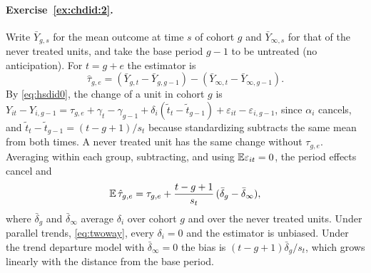 \paragraph{Exercise~\ref{ex:chdid:2}.} Write $\bar Y_{g,s}$ for the mean outcome at time $s$ of cohort $g$ and $\bar Y_{\infty,s}$ for that of the never treated units, and take the base period $g - 1$ to be untreated (no anticipation). For $t = g + e$ the estimator is
\[
\hat\tau_{g,e} = (\bar Y_{g,t} - \bar Y_{g,g-1}) - (\bar Y_{\infty,t} - \bar Y_{\infty,g-1}).
\]
By \eqref{eq:hsdid0}, the change of a unit in cohort $g$ is $Y_{it} - Y_{i,g-1} = \tau_{g,e} + \gamma_t - \gamma_{g-1} + \delta_i(\tilde t_t - \tilde t_{g-1}) + \varepsilon_{it} - \varepsilon_{i,g-1}$, since $\alpha_i$ cancels, and $\tilde t_t - \tilde t_{g-1} = (t - g + 1)/s_t$ because standardizing subtracts the same mean from both times. A never treated unit has the same change without $\tau_{g,e}$. Averaging within each group, subtracting, and using $\mathbb{E}\varepsilon_{it} = 0$, the period effects cancel and
\[
\mathbb{E}\,\hat\tau_{g,e} = \tau_{g,e} + \frac{t - g + 1}{s_t}\,(\bar\delta_g - \bar\delta_\infty),
\]
where $\bar\delta_g$ and $\bar\delta_\infty$ average $\delta_i$ over cohort $g$ and over the never treated units. Under parallel trends, \eqref{eq:twoway}, every $\delta_i = 0$ and the estimator is unbiased. Under the trend departure model with $\bar\delta_\infty = 0$ the bias is $(t - g + 1)\bar\delta_g/s_t$, which grows linearly with the distance from the base period. 

